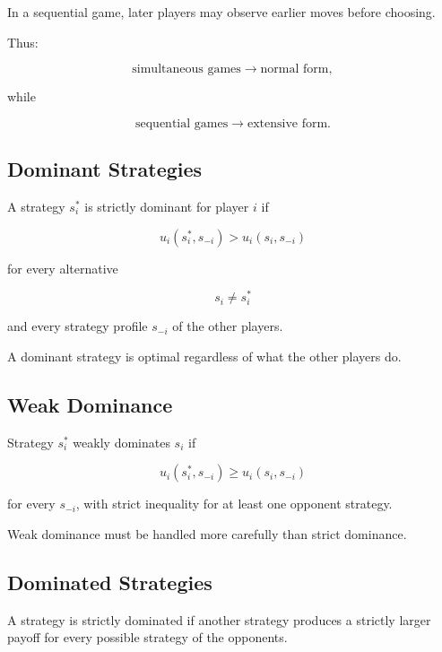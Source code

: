 In a sequential game, later players may observe earlier moves before
choosing.

Thus:

\[
\boxed{
\text{simultaneous games}
\rightarrow
\text{normal form},
}
\]

while

\[
\boxed{
\text{sequential games}
\rightarrow
\text{extensive form}.
}
\]

\subsection{Dominant Strategies}
\label{subsec:dominant-strategies}

A strategy \(s_i^*\) is strictly dominant for player \(i\) if

\[
\boxed{
u_i(s_i^*,s_{-i})
>
u_i(s_i,s_{-i})
}
\]

for every alternative

\[
s_i\neq s_i^*
\]

and every strategy profile \(s_{-i}\) of the other players.

A dominant strategy is optimal regardless of what the other players do.

\subsection{Weak Dominance}
\label{subsec:weak-dominance}

Strategy \(s_i^*\) weakly dominates \(s_i\) if

\[
\boxed{
u_i(s_i^*,s_{-i})
\geq
u_i(s_i,s_{-i})
}
\]

for every \(s_{-i}\), with strict inequality for at least one opponent
strategy.

Weak dominance must be handled more carefully than strict dominance.

\subsection{Dominated Strategies}
\label{subsec:dominated-strategies}

A strategy is strictly dominated if another strategy produces a strictly
larger payoff for every possible strategy of the opponents.

